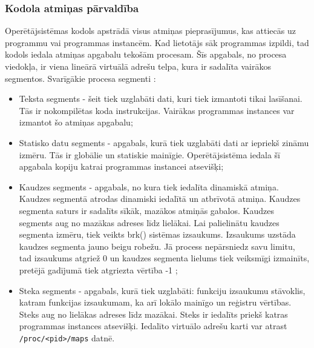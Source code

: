 \subsubsection{Kodola atmiņas pārvaldība}
Operētājsistēmas kodols apstrādā visus atmiņas pieprasījumus, kas attiecās uz programmu vai programmas instancēm.
Kad lietotājs sāk programmas izpildi, tad kodols iedala atmiņas apgabalu tekošām procesam.
Šīs apgabals, no procesa viedokļa, ir viena lineārā virtuālā adrešu telpa, kura ir sadalīta vairākos segmentos. 
Svarīgākie procesa segmenti  \cite {PETRSOF}:
\begin{itemize}
	\item   Teksta segments - šeit tiek uzglabāti dati, kuri tiek izmantoti tikai lasīšanai. Tās ir nokompilētas koda instrukcijas. 
    Vairākas programmas instances var izmantot šo atmiņas apgabalu;
    \item Statisko datu segments - apgabals, kurā tiek uzglabāti dati ar iepriekš zināmu izmēru. Tās ir globālie un statiskie mainīgie.
    Operētājsistēma iedala šī apgabala kopiju katrai programmas instancei atsevišķi;
    \item Kaudzes segments - apgabals, no kura tiek iedalīta dinamiskā atmiņa.
    Kaudzes segmentā atrodas dinamiski iedalītā un atbrīvotā atmiņa. Kaudzes segmenta saturs ir sadalīts sīkāk, mazākos atmiņās gabalos.
    Kaudzes segments aug no mazākas adreses līdz lielākai.  Lai palielinātu kaudzes segmenta izmēru, tiek veikts brk() sistēmas izsaukums. 
    Izsaukums uzstāda kaudzes segmenta jauno beigu robežu. 
 Jā process nepārsniedz savu limitu, tad izsaukums atgriež 0 un kaudzes segmenta lielums tiek veiksmīgi izmainīts, pretējā gadījumā tiek atgriezta vērtība -1 \cite{LINMAN};
    \item Steka segments - apgabals, kurā tiek uzglabāti: funkciju izsaukumu stāvoklis, katram funkcijas izsaukumam, ka arī lokālo mainīgo un reģistru vērtības. 
    Steks aug no lielākas adreses līdz mazākai. 
    Steks ir iedalīts priekš katras programmas instances atsevišķi.
     Iedalīto virtuālo adrešu karti var atrast \texttt{/proc/<pid>/maps} datnē.
\end{itemize} 

 
